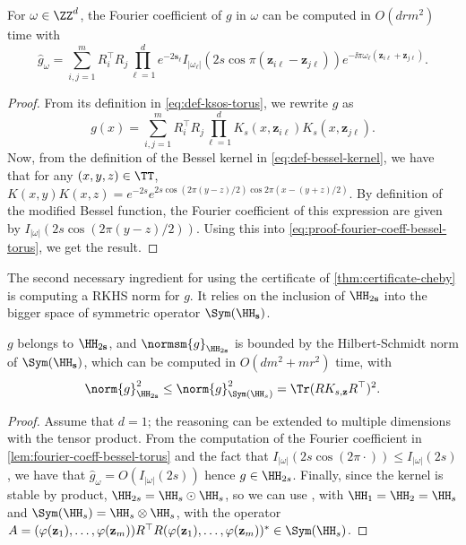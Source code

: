 \documentclass{article}
\begin{document}
\begin{lemma}\label{lem:fourier-coeff-bessel-torus}
  For $\omega \in \ZZ^d$, the Fourier coefficient of $g$ in $\omega$ can be computed in $O(d r m^2)$ time with
  \begin{equation}
    \hat{g}_\omega = \sum_{i, j = 1}^m R_i^\top R_j \prod_{\ell = 1}^{d} e^{-2 \mathbf{s}_\ell} I_{|\omega_\ell|}(2s \cos \pi (\mathbf{z}_{i \ell} - \mathbf{z}_{j \ell})) e^{-\ii \pi \omega_\ell (\mathbf{z}_{i \ell} + \mathbf{z}_{j \ell})}.
  \end{equation}
\end{lemma}
\begin{proof}
  From its definition in \cref{eq:def-ksos-torus}, we rewrite $g$ as
  \begin{equation}\label{eq:proof-fourier-coeff-bessel-torus}
    g(x) = \sum_{i, j = 1}^m R_i^\top R_j \prod_{\ell = 1}^d K_s(x, \mathbf{z}_{i \ell}) K_s(x, \mathbf{z}_{j \ell}).
  \end{equation}
  Now, from the definition of the Bessel kernel in \cref{eq:def-bessel-kernel}, we have that for any $(x, y, z) \in \TT$, $K(x, y) K(x, z) = e^{-2s} e^{2s \cos (2\pi (y - z)/2) \cos 2\pi (x - (y+z)/2)}$. By definition of the modified Bessel function, the Fourier coefficient of this expression are given by $I_{|\omega|}(2s \cos (2\pi (y - z)/2))$. Using this into \cref{eq:proof-fourier-coeff-bessel-torus}, we get the result.
\end{proof}

The second necessary ingredient for using the certificate of \cref{thm:certificate-cheby} is computing a RKHS norm for $g$. It relies on the inclusion of $\HH_{2\mathbf{s}}$ into the bigger space of symmetric operator $\Sym(\HH_\mathbf{s})$.

\begin{lemma}\label{lem:hsnorm-g-torus}
  $g$ belongs to $\HH_{2\mathbf{s}}$, and $\normsm{g}_{\HH_{2\mathbf{s}}}$ is bounded by the Hilbert-Schmidt norm of $\Sym(\HH_\mathbf{s})$, which can be computed in $O(d m^2 + m r^2)$ time, with
  \begin{equation}
    \norm{g}_{\HH_{2\mathbf{s}}}^2 \leq \norm{g}_{\Sym(\HH_s)}^2 = \Tr (R K_{s, \mathbf{z}} R^\top)^2.
  \end{equation}
\end{lemma}

\begin{proof}
  Assume that $d=1$; the reasoning can be extended to multiple dimensions with the tensor product. From the computation of the Fourier coefficient in \cref{lem:fourier-coeff-bessel-torus} and the fact that $I_{|\omega|}(2s \cos(2\pi \cdot)) \leq I_{|\omega|}(2s)$, we have that $\hat{g}_\omega = O(I_{|\omega|}(2s))$ hence $g \in \HH_{2s}$. Finally, since the kernel is stable by product, $\HH_{2s} = \HH_s \odot \HH_s$, so we can use \eg \cite[Thm. 5.16]{paulsenIntroductionTheoryReproducing2016}, with $\HH_1 = \HH_2 = \HH_s$ and $\Sym(\HH_s) = \HH_s \otimes \HH_s$, with the operator $A = (\varphi(\mathbf{z}_1), \dots, \varphi(\mathbf{z}_m)) R^\top R (\varphi(\mathbf{z}_1), \dots, \varphi(\mathbf{z}_m))^* \in \Sym(\HH_s)$.
\end{proof}
\end{document}
